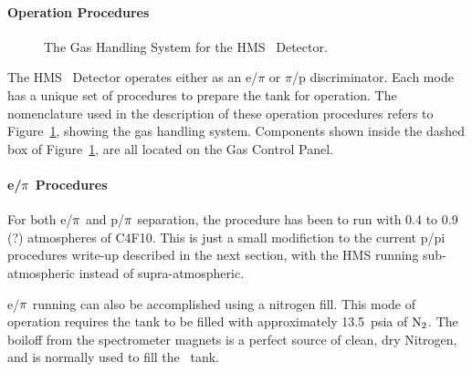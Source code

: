 \paragraph{Operation Procedures}

\begin{figure}
{}
\caption{The Gas Handling System for the HMS \Cerenkov\ Detector. \label{fig:gas}}
\end{figure}

The HMS \Cerenkov\ Detector operates either as an e/$\pi$ or $\pi$/p
discriminator. Each mode has a unique set of procedures to prepare the tank
for operation. The nomenclature used in the description of these operation
procedures refers to Figure~\ref{fig:gas}, showing the gas handling system. Components 
shown
inside the dashed box of Figure~\ref{fig:gas}, are all located on the Gas Control Panel.

\paragraph{e/$\bf{\pi}$ Procedures}
For both e/$\bf{\pi}$ and p/$\bf{\pi}$ separation, the procedure 
has been to run with 0.4 to
0.9 (?) atmospheres of C4F10.  This is just a small modifiction to the
current p/pi procedures write-up described in the next section,
with the HMS running sub-atmospheric instead of supra-atmospheric. 

e/$\bf{\pi}$ running can also be accomplished using a nitrogen fill.
This mode of operation requires the tank to be filled with approximately
13.5~psia of $\rm{N_2}$.  The boiloff from the spectrometer magnets is a
perfect source of clean, dry Nitrogen, and is normally used to fill the
\Cerenkov\ tank.


